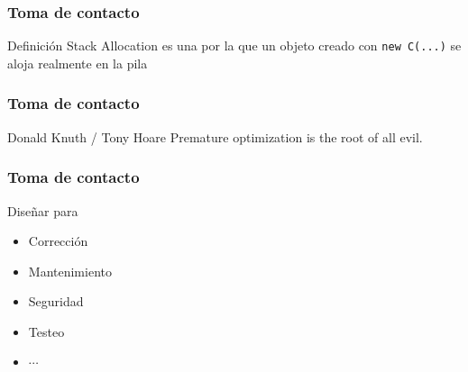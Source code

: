
\begin{frame}[fragile]
  \frametitle{Toma de contacto}
  \begin{block}{Definición}
    Stack Allocation es una 
    por la que un objeto creado con
    \verb|new C(...)| se aloja realmente en la pila
  \end{block}
\end{frame}

\begin{frame}[fragile]
  \frametitle{Toma de contacto}
  \begin{block}{Donald Knuth / Tony Hoare}
    {Premature optimization is the root of all evil.}
  \end{block}
\end{frame}

\begin{frame}[fragile]
  \frametitle{Toma de contacto}
  \begin{block}{Diseñar para}
    \begin{itemize}
    \item Corrección
    \item Mantenimiento
    \item Seguridad
    \item Testeo
    \item $\cdots$
    \end{itemize}
  \end{block}
\end{frame}

